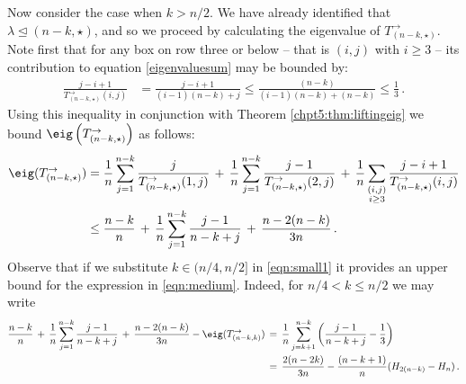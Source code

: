 \documentclass[11pt]{report}
\begin{document}
Now consider the case when $k>n/2$. We have already identified that 
$\lambda\trianglelefteq(n-k,\star)$, and so we proceed by calculating the 
eigenvalue of $T^\rightarrow_{(n-k,\star)}$. Note first that for any box on 
row three or below -- that is $(i,j)$ with $i\geq 3$ -- its contribution to equation \eqref{eigenvaluesum} may be bounded by: 
\begin{align*}
\frac{j-i+1}{T_{(n-k,\star)}^{\rightarrow}(i,j)} &= \frac{j-i+1}{(i-1)(n-k) + 
	j} \le \frac{(n-k)}{(i-1)(n-k) + (n-k)} \le \frac 13\,.
\end{align*}
Using this inequality in conjunction with Theorem \ref{chpt5:thm:liftingeig} we bound 
$\eig\left(T_{(n-k,\star)}^{\rightarrow}\right)$ as follows:
\begin{align}
\eig(T_{(n-k,\star)}^{\rightarrow}) & = \frac 1n \sum_{j=1}^{n-k} 
\frac{j}{T_{(n-k,\star)}^{\rightarrow}(1,j)} 
\,+\, \frac 1n\sum_{j=1}^{n-k} 
\frac{j-1}{T_{(n-k,\star)}^{\rightarrow}(2,j)} \, + \, \frac 1n 
\sum_{\substack{(i,j) \nonumber \\ 
		i\geq 3}} \frac{j-i+1}{T_{(n-k,\star)}^{\rightarrow}(i,j)} \\
& \leq \frac{n-k}{n} \,+\, \frac 1n \sum_{j=1}^{n-k} 
\frac{j-1}{n-k+j} \, + \,  \frac{n-2(n-k)}{3n}\,. \label{eqn:small1}
\end{align}
Observe that if we substitute $k \in(n/4,n/2]$ in \eqref{eqn:small1} 
it provides an upper bound for the expression in \eqref{eqn:medium}. 
Indeed, 
for $n/4<k\le n/2$ we may write
\begin{align}
\frac{n-k}{n} \,+\, \frac 1n \sum_{j=1}^{n-k} 
\frac{j-1}{n-k+j} \, + \,  \frac{n-2(n-k)}{3n} - 
\eig(T_{(n-k,k)}^{\rightarrow}) &\,=\, \frac 1n \sum_{j=k+1}^{n-k} 
\left(\frac{j-1}{n-k+j} -\frac 13 \right) \nonumber
\\
&\,= \,  \frac{2(n-2k)}{3n} - \frac{(n-k+1)}{n}(H_{2(n-k)}-H_n) \nonumber 
\,. 
\end{align}
\end{document}
